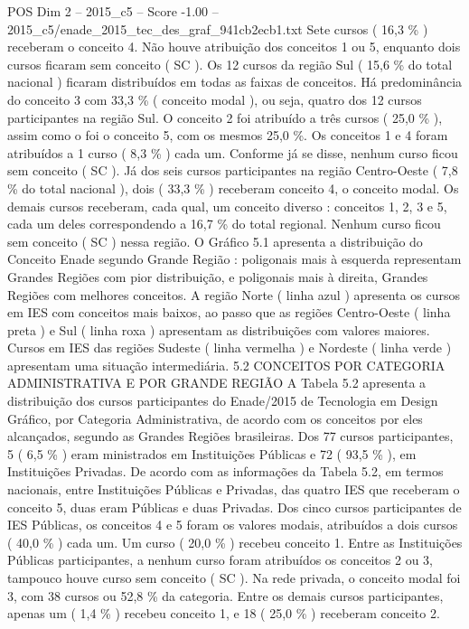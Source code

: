 \begin{textsample}{POS Dim 2 – 2015\_c5 – Score -1.00 – 2015\_c5/enade\_2015\_tec\_des\_graf\_941cb2ecb1.txt}
Sete cursos ( 16,3 \% ) receberam o conceito 4.
Não houve atribuição dos conceitos 1 ou 5, enquanto dois cursos ficaram sem conceito ( SC ).
Os 12 cursos da região Sul ( 15,6 \% do total nacional ) ficaram distribuídos em todas as faixas de conceitos.
Há predominância do conceito 3 com 33,3 \% ( conceito modal ), ou seja, quatro dos 12 cursos participantes na região Sul.
O conceito 2 foi atribuído a três cursos ( 25,0 \% ), assim como o foi o conceito 5, com os mesmos 25,0 \%.
Os conceitos 1 e 4 foram atribuídos a 1 curso ( 8,3 \% ) cada um.
Conforme já se disse, nenhum curso ficou sem conceito ( SC ).
Já dos seis cursos participantes na região Centro-Oeste ( 7,8 \% do total nacional ), dois ( 33,3 \% ) receberam conceito 4, o conceito modal.
Os demais cursos receberam, cada qual, um conceito diverso : conceitos 1, 2, 3 e 5, cada um deles correspondendo a 16,7 \% do total regional.
Nenhum curso ficou sem conceito ( SC ) nessa região.
O Gráfico 5.1 apresenta a distribuição do Conceito Enade segundo Grande Região : poligonais mais à esquerda representam Grandes Regiões com pior distribuição, e poligonais mais à direita, Grandes Regiões com melhores conceitos.
A região Norte ( linha azul ) apresenta os cursos em IES com conceitos mais baixos, ao passo que as regiões Centro-Oeste ( linha preta ) e Sul ( linha roxa ) apresentam as distribuições com valores maiores.
Cursos em IES das regiões Sudeste ( linha vermelha ) e Nordeste ( linha verde ) apresentam uma situação intermediária. 5.2 CONCEITOS POR CATEGORIA ADMINISTRATIVA E POR GRANDE REGIÃO A Tabela 5.2 apresenta a distribuição dos cursos participantes do Enade/2015 de Tecnologia em Design Gráfico, por Categoria Administrativa, de acordo com os conceitos por eles alcançados, segundo as Grandes Regiões brasileiras.
Dos 77 cursos participantes, 5 ( 6,5 \% ) eram ministrados em Instituições Públicas e 72 ( 93,5 \% ), em Instituições Privadas.
De acordo com as informações da Tabela 5.2, em termos nacionais, entre Instituições Públicas e Privadas, das quatro IES que receberam o conceito 5, duas eram Públicas e duas Privadas.
Dos cinco cursos participantes de IES Públicas, os conceitos 4 e 5 foram os valores modais, atribuídos a dois cursos ( 40,0 \% ) cada um.
Um curso ( 20,0 \% ) recebeu conceito 1.
Entre as Instituições Públicas participantes, a nenhum curso foram atribuídos os conceitos 2 ou 3, tampouco houve curso sem conceito ( SC ).
Na rede privada, o conceito modal foi 3, com 38 cursos ou 52,8 \% da categoria.
Entre os demais cursos participantes, apenas um ( 1,4 \% ) recebeu conceito 1, e 18 ( 25,0 \% ) receberam conceito 2.

\end{textsample}
